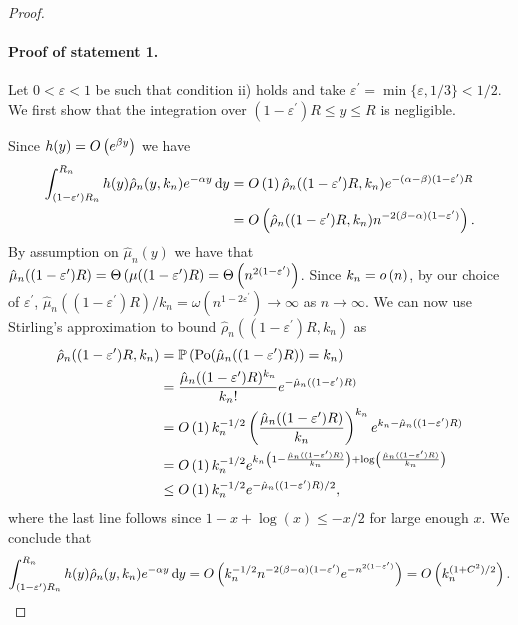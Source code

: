 \begin{proof} \hfill

\paragraph{Proof of statement 1.}
Let $0 < \varepsilon < 1$ be such that condition ii) holds and take $\varepsilon^\prime = \min\{\varepsilon,1/3\} < 1/2$. We first show that the integration over $(1-\varepsilon^\prime)R \le y \le R$ is negligible.
 
Since $h(y) = O\left(e^{\beta y}\right)$ we have
\begin{align*}
	\int_{(1-\varepsilon^\prime)R_n}^{R_n} h(y) \hat{\rho}_n(y,k_n) e^{-\alpha y} \operatorname{\mathrm{d}\hspace{-2pt}} y
	&= O\left(1\right) \hat{\rho}_n((1-\varepsilon^\prime)R,k_n) e^{-(\alpha-\beta)(1-\varepsilon^\prime)R} \\
	&= O\left(\hat{\rho}_n((1-\varepsilon^\prime)R,k_n) n^{-2(\beta-\alpha)(1-\varepsilon^\prime)}\right).
\end{align*}
By assumption on $\hat{\mu}_n(y)$ we have that $\hat{\mu}_n((1-\varepsilon^\prime)R) = \Theta\left(\mu((1-\varepsilon^\prime)R\right) = \Theta\left(n^{2(1-\varepsilon^\prime)}\right)$. Since $k_n = o\left(n\right)$, by our choice of $\varepsilon^\prime$, $\hat{\mu}_n((1-\varepsilon^\prime)R)/k_n = \omega\left(n^{1 - 2\varepsilon^\prime}\right) \to \infty$ as $n \to \infty$. We can now use Stirling's approximation to bound $\hat{\rho}_n((1-\varepsilon^\prime)R,k_n)$ as
\begin{align*}
	\hat{\rho}_n((1-\varepsilon^\prime)R,k_n) &= \mathbb{P}\left({\mathrm{Po}}(\hat{\mu}_n((1-\varepsilon^\prime)R)) = k_n\right) \\
	&= \frac{\hat{\mu}_n((1-\varepsilon^\prime)R)^{k_n}}{k_n!} e^{-\hat{\mu}_n((1-\varepsilon^\prime)R)}\\
	&= O\left(1\right) k_n^{-1/2} \left(\frac{\hat{\mu}_n((1-\varepsilon^\prime)R)}{k_n}\right)^{k_n} e^{k_n - \hat{\mu}_n((1-\varepsilon^\prime)R)}\\
	&= O\left(1\right) k_n^{-1/2} e^{k_n\left(1 - \frac{\hat{\mu}_n((1-\varepsilon^\prime)R)}{k_n}\right)+ \log\left(\frac{\hat{\mu}_n((1-\varepsilon^\prime)R)}{k_n}\right)}\\
	&\le O\left(1\right) k_n^{-1/2} e^{-\hat{\mu}_n((1-\varepsilon^\prime)R)/2},
\end{align*}
where the last line follows since $1 - x + \log(x) \le -x/2$ for large enough $x$. We conclude that
\[
	\int_{(1-\varepsilon^\prime)R_n}^{R_n} h(y) \hat{\rho}_n(y,k_n) e^{-\alpha y} \operatorname{\mathrm{d}\hspace{-2pt}} y
	= O\left(k_n^{-1/2} n^{-2(\beta-\alpha)(1-\varepsilon^\prime)} e^{-n^{2(1-\varepsilon^\prime)}}\right)
	= O\left(k_n^{(1+C^2)/2}\right).
\]


\end{proof}
